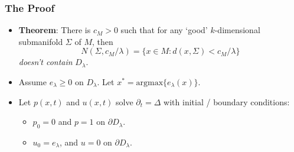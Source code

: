 \documentclass[usenames,dvipsnames,12pt]{beamer}
\DeclareMathOperator{\EE}{\mathbb{E}}
\begin{document}
\begin{frame}
    \frametitle{The Proof}

    \begin{itemize}
        \item {\bf Theorem}: There is $c_M > 0$ such that for any `good' $k$-dimensional submanifold $\Sigma$ of $M$, then
        \[ N(\Sigma, c_M / \lambda) = \{ x \in M : d(x,\Sigma) < c_M / \lambda \} \]
        \emph{doesn't contain} $D_\lambda$.

        \item Assume $e_\lambda \geq 0$ on $D_\lambda$. Let $x^* = \text{argmax} \{ e_\lambda(x) \}$.

        \item Let $p(x,t)$ and $u(x,t)$ solve $\partial_t = \Delta$ with initial / boundary conditions:
        \begin{itemize}
            \item $p_0 = 0$ and $p = 1$ on $\partial D_\lambda$.
            \item $u_0 = e_\lambda$, and $u = 0$ on $\partial D_\lambda$.
        \end{itemize}



    \end{itemize}
\end{frame}
\end{document}
